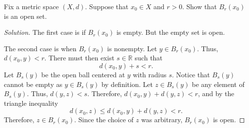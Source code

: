 \documentclass[11pt,letterpaper]{article}
\newcommand{\R}{\mathbb{R}}
\newcommand{\eps}{\varepsilon}
\newenvironment{prob}[1]
  {\renewcommand\theinnerprob{#1}\innerprob}
  {\endinnerprob}
\newenvironment{solution}
  {\renewcommand\qedsymbol{}\begin{proof}[Solution]}
  {\end{proof}\bigskip}
\begin{document}
%





\begin{prob}{5} %
Fix a metric space $(X,d)$.  Suppose that $x_0 \in X$ and $r>0$.  Show that $B_r(x_0)$ is an open set.
\end{prob}
\begin{solution}
	The first case is if $B_r(x_0)$ is empty. But the empty set is open.
	
	The second case is when $B_r(x_0)$ is nonempty. Let $y\in B_r(x_0)$. Thus, $d(x_0,y) < r$. There must then exist $s \in \R$ such that $$d(x_0,y) + s < r.$$ Let $B_s(y)$ be the open ball centered at $y$ with radius $s$. Notice that $B_s(y)$ cannot be empty as $y\in B_s(y)$ by definition. Let $z \in B_s(y)$ be any element of $B_s(y)$. Thus, $d(y,z) < s$. Therefore, $d(x_0,y) + d(y,z) < r$, and by the triangle inequality $$d(x_0,z) \leq d(x_0,y) + d(y,z) < r.$$ Therefore, $z\in B_r(x_0)$. Since the choice of $z$ was arbitrary, $B_r(x_0)$ is open. 
	
	 
\end{solution}
\newpage
\end{document}
